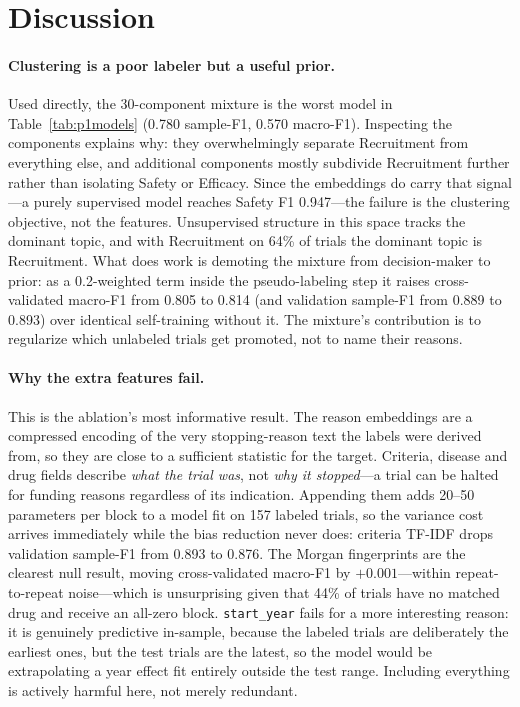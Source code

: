 \section{Discussion}
\label{sec:discussion}

\paragraph{Clustering is a poor labeler but a useful prior.}
Used directly, the 30-component mixture is the worst model in
Table~\ref{tab:p1models} (0.780 sample-F1, 0.570 macro-F1). Inspecting the
components explains why: they overwhelmingly separate Recruitment from
everything else, and additional components mostly subdivide Recruitment further
rather than isolating Safety or Efficacy. Since the embeddings do carry that
signal---a purely supervised model reaches Safety F1 0.947---the failure is the
clustering objective, not the features. Unsupervised structure in this space
tracks the dominant topic, and with Recruitment on 64\% of trials the dominant
topic is Recruitment. What does work is demoting the mixture from decision-maker
to prior: as a 0.2-weighted term inside the pseudo-labeling step it raises
cross-validated macro-F1 from 0.805 to 0.814 (and validation sample-F1 from 0.889
to 0.893) over identical self-training without it. The mixture's contribution is
to regularize which unlabeled trials get promoted, not to name their reasons.

\paragraph{Why the extra features fail.}
This is the ablation's most informative result. The reason embeddings are a
compressed encoding of the very stopping-reason text the labels were derived
from, so they are close to a sufficient statistic for the target. Criteria,
disease and drug fields describe \emph{what the trial was}, not \emph{why it
stopped}---a trial can be halted for funding reasons regardless of its indication.
Appending them adds 20--50 parameters per block to a model fit on 157 labeled
trials, so the variance cost arrives immediately while the bias reduction never
does: criteria TF-IDF drops validation sample-F1 from 0.893 to 0.876. The Morgan
fingerprints are the clearest null result, moving cross-validated macro-F1 by
$+0.001$---within repeat-to-repeat noise---which is unsurprising given that 44\%
of trials have no matched drug and receive an all-zero block. \texttt{start\_year}
fails for a more interesting reason: it is genuinely predictive in-sample, because
the labeled trials are deliberately the earliest ones, but the test trials are the
latest, so the model would be extrapolating a year effect fit entirely outside the
test range. Including everything is actively harmful here, not merely redundant.

